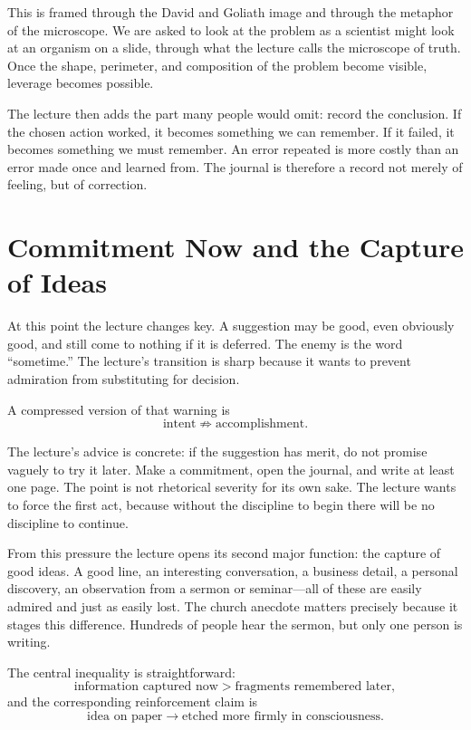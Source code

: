 This is framed through the David and Goliath image and through the metaphor of the microscope. We are asked to look at the problem as a scientist might look at an organism on a slide, through what the lecture calls the microscope of truth. Once the shape, perimeter, and composition of the problem become visible, leverage becomes possible.

The lecture then adds the part many people would omit: record the conclusion. If the chosen action worked, it becomes something we can remember. If it failed, it becomes something we must remember. An error repeated is more costly than an error made once and learned from. The journal is therefore a record not merely of feeling, but of correction.

\section{Commitment Now and the Capture of Ideas}

At this point the lecture changes key. A suggestion may be good, even obviously good, and still come to nothing if it is deferred. The enemy is the word ``sometime.'' The lecture's transition is sharp because it wants to prevent admiration from substituting for decision.

A compressed version of that warning is
\begin{equation}
\text{intent}\not\Rightarrow \text{accomplishment}.
\end{equation}

The lecture's advice is concrete: if the suggestion has merit, do not promise vaguely to try it later. Make a commitment, open the journal, and write at least one page. The point is not rhetorical severity for its own sake. The lecture wants to force the first act, because without the discipline to begin there will be no discipline to continue.

From this pressure the lecture opens its second major function: the capture of good ideas. A good line, an interesting conversation, a business detail, a personal discovery, an observation from a sermon or seminar---all of these are easily admired and just as easily lost. The church anecdote matters precisely because it stages this difference. Hundreds of people hear the sermon, but only one person is writing.

The central inequality is straightforward:
\begin{equation}
\text{information captured now}>\text{fragments remembered later},
\end{equation}
and the corresponding reinforcement claim is
\begin{equation}
\text{idea on paper}\rightarrow \text{etched more firmly in consciousness}.
\end{equation}

